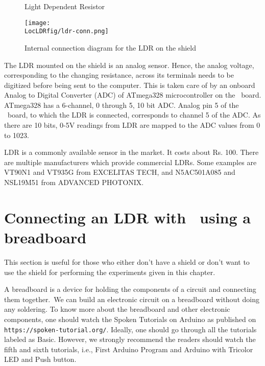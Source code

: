 \begin{figure}
\centering
{} \hfill
{}
\caption{Light Dependent Resistor}
\end{figure}

\begin{figure}
\centering
\texttt{[image: \\LocLDRfig/ldr-conn.png]}
\caption{Internal connection diagram for the LDR on the shield}
\label{fig:ldrconn}
\end{figure}

The LDR mounted on the shield is an analog sensor. Hence, the analog voltage, corresponding to the changing resistance, across its terminals needs to be digitized before being sent to the computer. This is taken care of by an onboard Analog to Digital Converter (ADC) of ATmega328 microcontroller on the \arduino\
board. ATmega328 has a 6-channel, 0 through 5, 10 bit ADC. Analog pin
5 of the \arduino\ board, to which the LDR is connected, corresponds
to channel 5 of the ADC.  As there are 10 bits, 0-5V readings from LDR
are mapped to the ADC values from 0 to 1023. 

LDR is a commonly available sensor in the market. It costs about
Rs. 100. There are multiple manufacturers which provide commercial
LDRs.  Some examples are VT90N1 and VT935G from EXCELITAS TECH, and
N5AC501A085 and NSL19M51 from ADVANCED PHOTONIX. 

\section{Connecting an LDR with \arduino\ using a breadboard}
This section is useful for those who either don't have a shield or don't want to use the shield
for performing the experiments given in this chapter. 

A breadboard is a device for holding the components of a circuit and connecting 
them together. We can build an electronic circuit on a breadboard without doing any 
soldering. To know more about the breadboard and other electronic components, 
one should watch the Spoken Tutorials on Arduino as published on
{\tt https://spoken-tutorial.org/}. Ideally, one should go through all the
tutorials labeled as Basic. However, we strongly recommend the readers should
watch the fifth and sixth tutorials, i.e., First Arduino Program and 
Arduino with Tricolor LED and Push button.


